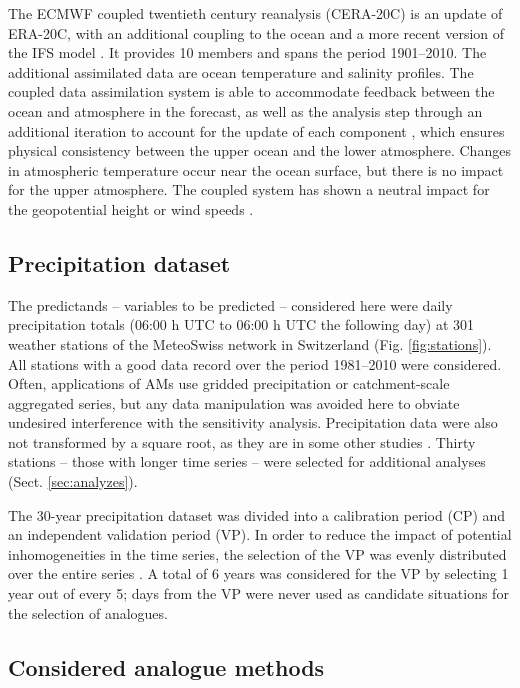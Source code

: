 \documentclass{ametsoc}
\begin{document}
	The ECMWF coupled twentieth century reanalysis (CERA-20C) is an update of ERA-20C, with an additional coupling to the ocean and a more recent version of the IFS model \citep{Laloyaux2017}. It provides 10 members and spans the period 1901--2010. The additional assimilated data are ocean temperature and salinity profiles. The coupled data assimilation system is able to accommodate feedback between the ocean and atmosphere in the forecast, as well as the analysis step through an additional iteration to account for the update of each component \citep{Laloyaux2016}, which ensures physical consistency between the upper ocean and the lower atmosphere. Changes in atmospheric temperature occur near the ocean surface, but there is no impact for the upper atmosphere. The coupled system has shown a neutral impact for the geopotential height or wind speeds \citep{Laloyaux2016}.
	
	
	
	\subsection{Precipitation dataset}
	\label{sec:precip}
	
	The predictands -- variables to be predicted -- considered here were daily precipitation totals (06:00 h UTC to 06:00 h UTC the following day) at 301 weather stations of the MeteoSwiss network in Switzerland (Fig. \ref{fig:stations}). All stations with a good data record over the period 1981--2010 were considered. Often, applications of AMs use gridded precipitation or catchment-scale aggregated series, but any data manipulation was avoided here to obviate undesired interference with the sensitivity analysis. Precipitation data were also not transformed by a square root, as they are in some other studies \cite[see e.g.][]{Bontron2004}. Thirty stations -- those with longer time series -- were selected for additional analyses (Sect. \ref{sec:analyzes}).
	
	The 30-year precipitation dataset was divided into a calibration period (CP) and an independent validation period (VP). In order to reduce the impact of potential inhomogeneities in the time series, the selection of the VP was evenly distributed over the entire series \citep[as in][]{BenDaoud2010}. A total of 6 years was considered for the VP by selecting 1 year out of every 5; days from the VP were never used as candidate situations for the selection of analogues.
	
	
	\subsection{Considered analogue methods}
	\label{sec:ams}
	
\end{document}

